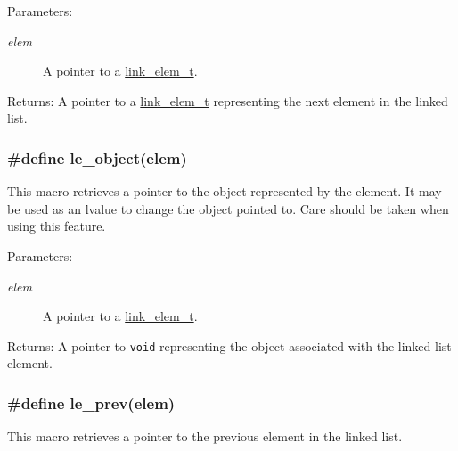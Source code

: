 \begin{Desc}
\item[Parameters:]
\begin{description}
\item[{\em elem}]A pointer to a \hyperlink{group__dbprim__link_a1}{link\_\-elem\_\-t}.\end{description}
\end{Desc}
\begin{Desc}
\item[Returns:]A pointer to a \hyperlink{group__dbprim__link_a1}{link\_\-elem\_\-t} representing the next element in the linked list. \end{Desc}
\hypertarget{group__dbprim__link_a23}{
\subsubsection[le\_\-object]{\setlength{\rightskip}{0pt plus 5cm}\#define le\_\-object(elem)}}
\label{group__dbprim__link_a23}


This macro retrieves a pointer to the object represented by the element. It may be used as an lvalue to change the object pointed to. Care should be taken when using this feature.

\begin{Desc}
\item[Parameters:]
\begin{description}
\item[{\em elem}]A pointer to a \hyperlink{group__dbprim__link_a1}{link\_\-elem\_\-t}.\end{description}
\end{Desc}
\begin{Desc}
\item[Returns:]A pointer to {\tt void} representing the object associated with the linked list element. \end{Desc}
\hypertarget{group__dbprim__link_a22}{
\subsubsection[le\_\-prev]{\setlength{\rightskip}{0pt plus 5cm}\#define le\_\-prev(elem)}}
\label{group__dbprim__link_a22}


This macro retrieves a pointer to the previous element in the linked list.

